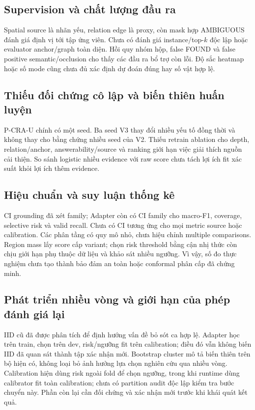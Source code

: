 \subsection{Supervision và chất lượng đầu ra}

Spatial source là nhãn yếu, relation edge là proxy, còn mask hợp
AMBIGUOUS đánh giá định vị tới tập ứng viên. Chưa có đánh giá
instance/top-$k$ độc lập hoặc evaluator anchor/graph toàn diện.
Hồi quy nhóm hộp, false FOUND và false positive semantic/occlusion
cho thấy các đầu ra bổ trợ còn lỗi. Độ sắc heatmap hoặc số mode
cũng chưa đủ xác định dự đoán đúng hay số vật hợp lệ.

\subsection{Thiếu đối chứng cô lập và biến thiên huấn luyện}

P-CRA-U chính có một seed. Ba seed V3 thay đổi nhiều yếu tố đồng
thời và không thay cho bằng chứng nhiều seed của V2. Thiếu retrain
ablation cho depth, relation/anchor, answerability/source và ranking
giới hạn việc giải thích nguồn cải thiện. So sánh logistic nhiều
evidence với raw score chưa tách lợi ích fit xác suất khỏi lợi ích
thêm evidence.

\subsection{Hiệu chuẩn và suy luận thống kê}

CI grounding đã xét family; Adapter còn có CI family cho macro-F1, coverage, selective risk và valid recall. Chưa có CI tương ứng cho mọi metric source hoặc calibration. Các phân tầng có quy mô nhỏ,
chưa hiệu chỉnh multiple comparisons. Region mass lấy score cấp
variant; chọn risk threshold bằng cận nhị thức còn chịu giới hạn
phụ thuộc dữ liệu và khảo sát nhiều ngưỡng. Vì vậy, số đo thực nghiệm
chưa tạo thành bảo đảm an toàn hoặc conformal phân cấp đã chứng minh.

\subsection{Phát triển nhiều vòng và giới hạn của phép đánh giá lại}

IID cũ đã được phân tích để định hướng vấn đề bỏ sót ca hợp lệ.
Adapter học trên train, chọn trên dev, risk/ngưỡng fit trên calibration;
điều đó vẫn không biến IID đã quan sát thành tập xác nhận mới.
Bootstrap cluster mô tả biến thiên trên bộ hiện có, không loại bỏ ảnh
hưởng lựa chọn nghiên cứu qua nhiều vòng. Calibration hiện dùng risk
ngoài fold để chọn ngưỡng, trong khi runtime dùng calibrator fit toàn
calibration; chưa có partition audit độc lập kiểm tra bước chuyển này.
Phần còn lại cần đối chứng và xác nhận mới trước khi khái quát kết quả.


